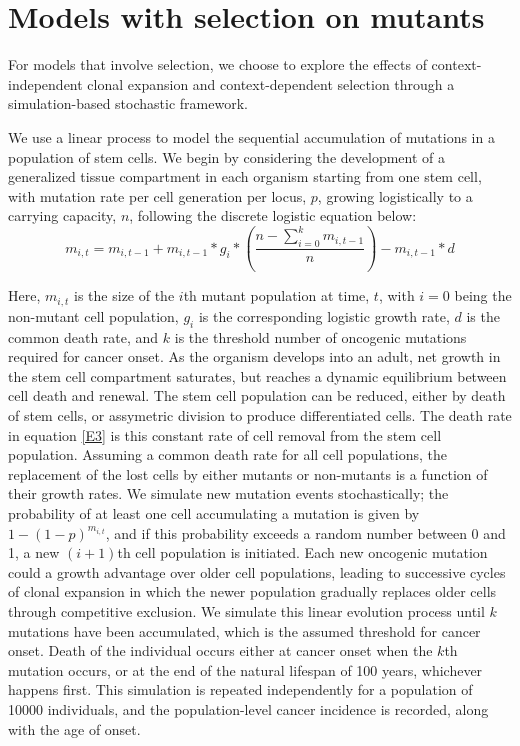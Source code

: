 \documentclass[10pt,twocolumn,twoside]{article}
\begin{document}
\section{Models with selection on mutants}
For models that involve selection, we choose to explore the effects of context-independent clonal expansion and context-dependent selection through a simulation-based stochastic framework. 

We use a linear process to model the sequential accumulation of mutations in a population of stem cells. We begin by considering the development of a generalized tissue compartment in each organism starting from one stem cell, with mutation rate per cell generation per locus, $p$, growing logistically to a carrying capacity, $n$, following the discrete logistic equation below:
\begin{equation}
	m_{i, t} = m_{i, t-1} + m_{i, t-1}*g_{i}*(\dfrac{n-\sum_{i=0}^{k} m_{i, t-1}}{n}) - m_{i, t-1}*d
	\label{E3}	
\end{equation}

Here, $m_{i, t}$ is the size of the $i$th mutant population at time, $t$, with $i=0$ being the non-mutant cell population, $g_{i}$ is the corresponding logistic growth rate, $d$ is the common death rate, and $k$ is the threshold number of oncogenic mutations required for cancer onset. As the organism develops into an adult, net growth in the stem cell compartment saturates, but reaches a dynamic equilibrium between cell death and renewal. The stem cell population can be reduced, either by death of stem cells, or assymetric division to produce differentiated cells. The death rate in equation \ref{E3} is this constant rate of cell removal from the stem cell population. Assuming a common death rate for all cell populations, the replacement of the lost cells by either mutants or non-mutants is a function of their growth rates. We simulate new mutation events stochastically; the probability of at least one cell accumulating a mutation is given by $1-(1-p)^{m_{i, t}}$, and if this probability exceeds a random number between 0 and 1, a new $(i+1)$th cell population is initiated. Each new oncogenic mutation could a growth advantage over older cell populations, leading to successive cycles of clonal expansion in which the newer population gradually replaces older cells through competitive exclusion. We simulate this linear evolution process until $k$ mutations have been accumulated, which is the assumed threshold for cancer onset. Death of the individual occurs either at cancer onset when the $k$th mutation occurs, or at the end of the natural lifespan of 100 years, whichever happens first. This simulation is repeated independently for a population of 10000 individuals, and the population-level cancer incidence is recorded, along with the age of onset.
\end{document}
